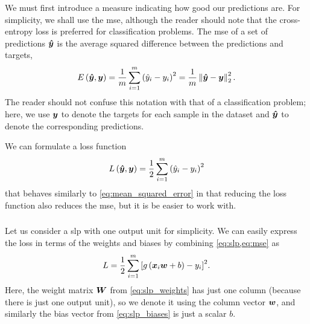 \documentclass[../report.tex]{subfiles}
\begin{document}
We must first introduce a measure indicating how good our predictions are.
For simplicity, we shall use the \gls{mse}, although the reader should note that the cross-entropy loss is preferred for classification problems.
The \gls{mse} of a set of predictions ${\bm{\hat{y}}}$ is the average squared difference between the predictions and targets,
\begin{equation}
    \label{eq:mean_squared_error}
    E\left( {\bm{\hat{y}}}, {\bm{y}} \right) = \frac{1}{m} \sum_{i=1}^m{\left(\hat{y}_i - y_i\right)^2} = \frac{1}{m} \left\lVert{\bm{\hat{y}}}-{\bm{y}}\right\rVert_2^2.
\end{equation}
The reader should not confuse this notation with that of a classification problem; here, we use ${\bm{y}}$ to denote the targets for each sample in the dataset and ${\bm{\hat{y}}}$ to denote the corresponding predictions.

We can formulate a loss function
\begin{equation}
    \label{eq:mse}
    L\left( {\bm{\hat{y}}}, {\bm{y}} \right) = \frac{1}{2} \sum_{i=1}^m{\left(\hat{y}_i - y_i\right)^2}
\end{equation}
that behaves similarly to \cref{eq:mean_squared_error} in that reducing the loss function also reduces the \gls{mse}, but it is be easier to work with.

\subsubsection{}
Let us consider a \gls{slp} with one output unit for simplicity. 
We can easily express the loss in terms of the weights and biases by combining \cref{eq:slp,eq:mse} as
\begin{equation}
    L = \frac{1}{2} \sum_{i=1}^m{\left[g\left(
        {\bm{x}}_i {\bm{w}} + b
    \right) - y_i\right]^2}.
\end{equation}
Here, the weight matrix ${\bm{W}}$ from \cref{eq:slp_weights} has just one column (because there is just one output unit), so we denote it using the column vector ${\bm{w}}$, and similarly the bias vector from \cref{eq:slp_biases} is just a scalar $b$.
\end{document}
